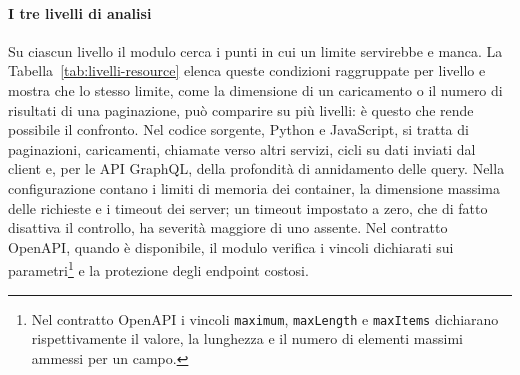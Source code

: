 \paragraph{I tre livelli di analisi}
\label{sec:resource-layers}

Su ciascun livello il modulo cerca i punti in cui un limite servirebbe e manca.
La Tabella~\ref{tab:livelli-resource} elenca queste condizioni raggruppate per
livello e mostra che lo stesso limite, come la dimensione di un caricamento o
il numero di risultati di una paginazione, può comparire su più livelli: è
questo che rende possibile il confronto. Nel codice sorgente, Python e
JavaScript, si tratta di paginazioni, caricamenti, chiamate verso altri
servizi, cicli su dati inviati dal client e, per le API GraphQL, della
profondità di annidamento delle query. Nella configurazione contano i limiti di
memoria dei container, la dimensione massima delle richieste e i timeout dei
server; un timeout impostato a zero, che di fatto disattiva il controllo, ha
severità maggiore di uno assente. Nel contratto OpenAPI, quando è disponibile,
il modulo verifica i vincoli dichiarati sui
parametri\footnote{Nel contratto OpenAPI i vincoli \texttt{maximum},
\texttt{maxLength} e \texttt{maxItems} dichiarano rispettivamente il valore, la
lunghezza e il numero di elementi massimi ammessi per un campo.} e la
protezione degli endpoint costosi.

